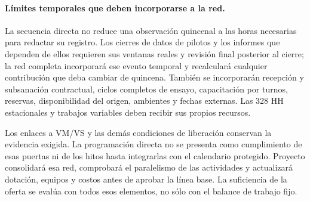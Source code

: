 \paragraph{Límites temporales que deben incorporarse a la red.}
La secuencia directa no reduce una observación quincenal a las horas necesarias para redactar su registro. Los cierres de datos de pilotos y los informes que dependen de ellos requieren sus ventanas reales y revisión final posterior al cierre; la red completa incorporará ese evento temporal y recalculará cualquier contribución que deba cambiar de quincena. También se incorporarán recepción y subsanación contractual, ciclos completos de ensayo, capacitación por turnos, reservas, disponibilidad del origen, ambientes y fechas externas. Las 328 HH estacionales y trabajos variables deben recibir sus propios recursos.

Los enlaces a VM/VS y las demás condiciones de liberación conservan la evidencia exigida. La programación directa no se presenta como cumplimiento de esas puertas ni de los hitos hasta integrarlas con el calendario protegido. Proyecto consolidará esa red, comprobará el paralelismo de las actividades y actualizará dotación, equipos y costos antes de aprobar la línea base. La suficiencia de la oferta se evalúa con todos esos elementos, no sólo con el balance de trabajo fijo.
